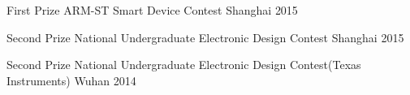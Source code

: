 




\begin{cvhonors}


\cvhonor
{First Prize} %
{ARM-ST Smart Device Contest} %
{Shanghai} %
{2015} %

\cvhonor
{Second Prize} %
{National Undergraduate Electronic Design Contest} %
{Shanghai} %
{2015} %

\cvhonor
{Second Prize} %
{National Undergraduate Electronic Design Contest(Texas Instruments)} %
{Wuhan} %
{2014} %



\end{cvhonors}

